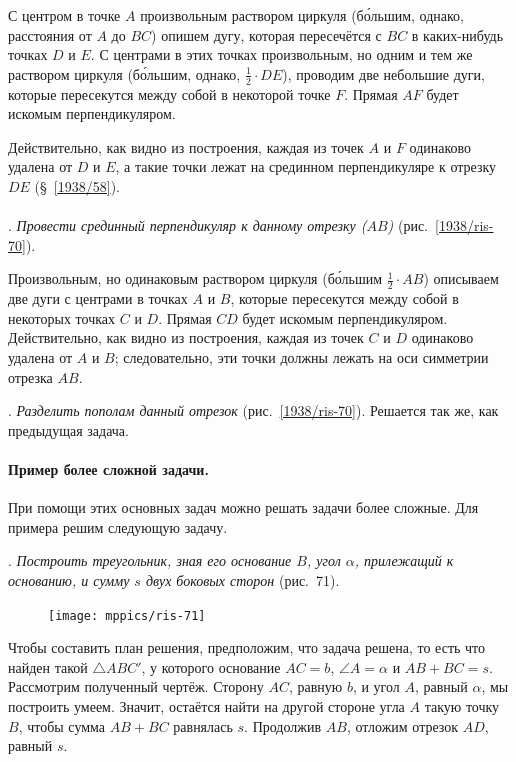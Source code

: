 \documentclass[twoside]{book}
\begin{document}
С центром в точке $A$ произвольным раствором циркуля (б\'{о}льшим, однако, расстояния от $A$ до $BC$) опишем дугу, которая пересечётся с $BC$ в каких-нибудь точках $D$ и $E$.
С центрами в этих точках произвольным, но одним и тем же раствором циркуля (б\'{о}льшим, однако, $\tfrac12\cdot DE$), проводим две небольшие дуги, которые пересекутся между собой в некоторой точке $F$.
Прямая $AF$ будет искомым перпендикуляром.

Действительно, как видно из построения, каждая из точек $A$ и $F$ одинаково удалена от $D$ и $E$, а такие точки лежат на срединном перпендикуляре к отрезку $DE$ (§~\ref{1938/58}).

\paragraph{}\label{1938/67}
\mbox{.}
\emph{Провести срединный перпендикуляр к данному отрезку \emph{($AB$)}} (рис.~\ref{1938/ris-70}).

Произвольным, но одинаковым раствором циркуля (б\'{о}льшим $\tfrac12\cdot AB$) описываем две дуги с центрами в точках $A$ и $B$, которые пересекутся между собой в некоторых точках $C$ и $D$.
Прямая $CD$ будет искомым перпендикуляром.
Действительно, как видно из построения, каждая из точек $C$ и $D$ одинаково удалена от $A$ и $B$;
следовательно, эти точки должны лежать на оси симметрии отрезка $AB$.

\smallskip
{}.
\emph{Разделить пополам данный отрезок} (рис.~\ref{1938/ris-70}).
Решается так же, как предыдущая задача.

\paragraph{Пример более сложной задачи.}\label{1938/68}
При помощи этих основных задач можно решать задачи более сложные.
Для примера решим следующую задачу.

\smallskip
{}.
\emph{Построить треугольник, зная его основание $B$, угол $\alpha$, прилежащий к основанию, и сумму $s$ двух боковых сторон} (рис.~71).

\begin{figure}[h!]
\centering
\texttt{[image: mppics/ris-71]}
\caption{}\label{1938/ris-71}
\end{figure}

Чтобы составить план решения, предположим, что задача решена, то есть что найден такой $\triangle ABC'$, у которого основание $AC = b$, $\angle A=\alpha$ и $AB+BC=s$.
Рассмотрим полученный чертёж.
Сторону $AC$, равную $b$, и угол $A$, равный $\alpha$, мы построить умеем.
Значит, остаётся найти на другой стороне угла $A$ такую точку $B$, чтобы сумма $AB+BC$ равнялась $s$.
Продолжив $AB$, отложим отрезок $AD$, равный $s$.
\end{document}
